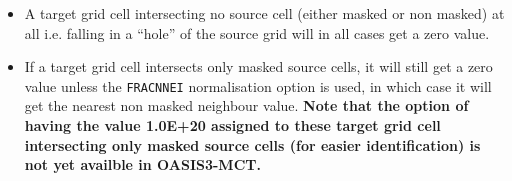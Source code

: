 \begin{itemize}
\begin{itemize}
\item A target grid cell intersecting no source cell (either 
    masked or non masked) at all i.e. falling in a ``hole'' of the source grid
    will in all cases get a zero value. 
    
\item If a target grid cell intersects only masked source cells, 
    it will still get a zero value unless the {\tt FRACNNEI}
    normalisation option is used, in which case it will get the
    nearest non masked neighbour value. {\bf Note that the option of
      having the value 1.0E+20 assigned to these target grid cell
      intersecting only masked source cells (for easier
      identification) is not yet availble in OASIS3-MCT.}
   

    
   
\end{itemize}








\end{itemize}
